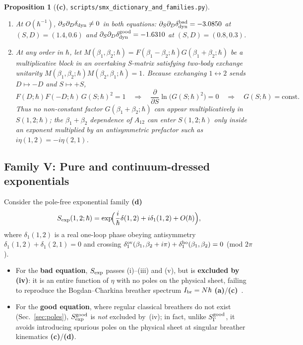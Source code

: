 \documentclass[11pt,a4paper]{article}
\newcommand{\La}{\textsf{\textbf{(a)}}}
\newcommand{\Lc}{\textsf{\textbf{(c)}}}
\newcommand{\Ld}{\textsf{\textbf{(d)}}}
\newcommand{\script}[1]{\texttt{scripts/\allowbreak #1}}
\newtheorem{proposition}{Proposition}[section]
\theoremstyle{remark}
\begin{document}
\begin{proposition}[\Lc, \script{smx\_dictionary\_and\_families.py}]\label{prop:fam4}
\begin{enumerate}
\item At $O(\hbar^{-1})$, $\partial_S\partial_D\delta_{\rm dyn}\neq 0$ in both equations: $\partial_S\partial_D\delta_{\rm dyn}^{\rm bad}=-3.0850$ at $(S,D)=(1.4,0.6)$ and $\partial_S\partial_D\delta_{\rm dyn}^{\rm good}=-1.6310$ at $(S,D)=(0.8,0.3)$.
\item At \emph{any} order in $\hbar$, let $M(\beta_1,\beta_2;\hbar)=F(\beta_1-\beta_2;\hbar)G(\beta_1+\beta_2;\hbar)$ be a multiplicative block in an overtaking S-matrix satisfying two-body exchange unitarity $M(\beta_1,\beta_2;\hbar)M(\beta_2,\beta_1;\hbar)=1$. Because exchanging $1\leftrightarrow 2$ sends $D\mapsto -D$ and $S\mapsto +S$,
\begin{equation}\label{eq:mirror_unitarity}
F(D;\hbar)F(-D;\hbar)\,G(S;\hbar)^2=1\quad\Longrightarrow\quad
\frac{\partial}{\partial S}\ln\bigl(G(S;\hbar)^2\bigr)=0\quad\Longrightarrow\quad G(S;\hbar)=\text{const.}
\end{equation}
Thus no non-constant factor $G(\beta_1+\beta_2;\hbar)$ can appear multiplicatively in $S(1,2;\hbar)$; the $\beta_1+\beta_2$ dependence of $A_{12}$ can enter $S(1,2;\hbar)$ only inside an exponent multiplied by an antisymmetric prefactor such as $i\eta(1,2)=-i\eta(2,1)$.
\end{enumerate}
\end{proposition}

\subsection{Family V: Pure and continuum-dressed exponentials}
Consider the pole-free exponential family \Ld
\begin{equation}\label{eq:fam5}
S_{\rm exp}(1,2;\hbar)=\exp\!\Bigl(\frac{i}{\hbar}\delta(1,2)+i\delta_1(1,2)+O(\hbar)\Bigr),
\end{equation}
where $\delta_1(1,2)$ is a real one-loop phase obeying antisymmetry $\delta_1(1,2)+\delta_1(2,1)=0$ and crossing $\delta_1^{\rm ov}(\beta_1,\beta_2+i\pi)+\delta_1^{\rm ho}(\beta_1,\beta_2)=0$ (mod $2\pi$).
\begin{itemize}
\item For the \textbf{bad equation}, $S_{\rm exp}$ passes (i)--(iii) and (v), but is \textbf{excluded by (iv)}: it is an entire function of $\eta$ with no poles on the physical sheet, failing to reproduce the Bogdan--Charkina breather spectrum $I_{\rm br}=N\hbar$ \La/\Lc~\cite{BC}.
\item For the \textbf{good equation}, where regular classical breathers do not exist (Sec.~\ref{sec:poles}), $S_{\rm exp}^{\rm good}$ is \emph{not} excluded by~(iv); in fact, unlike $S_\Gamma^{\rm good}$, it avoids introducing spurious poles on the physical sheet at singular breather kinematics \Lc/\Ld.
\end{itemize}
\end{document}
